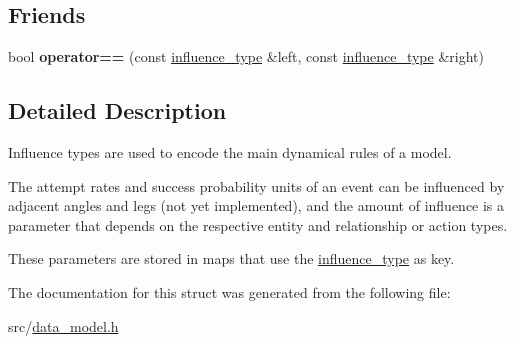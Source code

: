 \subsection*{Friends}
\begin{DoxyCompactItemize}
\item 
\mbox{\label{structtricl_1_1influence__type_a4f5b42686b09f580c15f8fa9f3aa296f}} 
bool {\bfseries operator==} (const \hyperlink{structtricl_1_1influence__type}{influence\+\_\+type} \&left, const \hyperlink{structtricl_1_1influence__type}{influence\+\_\+type} \&right)
\end{DoxyCompactItemize}


\subsection{Detailed Description}
Influence types are used to encode the main dynamical rules of a model. 

The attempt rates and success probability units of an event can be influenced by adjacent angles and legs (not yet implemented), and the amount of influence is a parameter that depends on the respective entity and relationship or action types.

These parameters are stored in maps that use the \hyperlink{structtricl_1_1influence__type}{influence\+\_\+type} as key. 

The documentation for this struct was generated from the following file\+:\begin{DoxyCompactItemize}
\item 
src/\hyperlink{data__model_8h}{data\+\_\+model.\+h}\end{DoxyCompactItemize}
